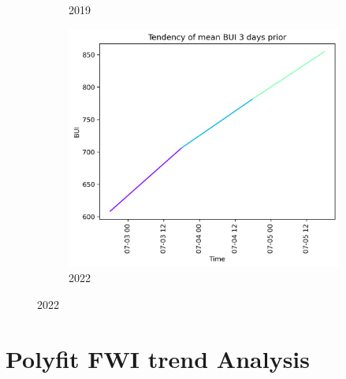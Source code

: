 \begin{figure}[h]
\begin{subfigure}{0.3\textwidth}
		\caption{2019}
		\label{fig:bui_prior_3_days_2019}
	\end{subfigure}
	\hfill
	\begin{subfigure}{0.3\textwidth}
		\centering
		\includegraphics[width=\textwidth]{graphs/3days/2022_3daysprior_tendency_graph_BUI.png}
		\caption{2022}
		\label{fig:bui_prior_3_days_2022}
	\end{subfigure}
	
	\label{fig:bui_values_3days_prior}
\end{figure}


\section{Polyfit FWI trend Analysis}

